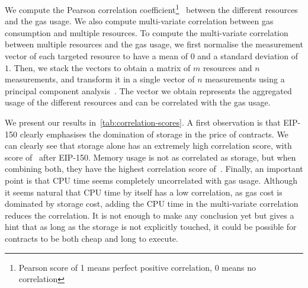 We compute the Pearson correlation coefficient\footnote{Pearson score of 1 means perfect positive correlation, 0 means no correlation}~\cite{boslaugh2012statistics} between the different resources and the gas usage. We also compute multi-variate correlation between gas consumption and multiple resources. To compute the multi-variate correlation between multiple resources and the gas usage, we first normalise the measurement vector of each targeted resource to have a mean of $0$ and a standard deviation of $1$. Then, we stack the vectors to obtain a matrix of $m$ resources and $n$ measurements, and transform it in a single vector of $n$ measurements using a principal component analysis~\cite{abdi2010principal}. The vector we obtain represents the aggregated usage of the different resources and can be correlated with the gas usage.

We present our results in~\autoref{tab:correlation-scores}. A first observation is that EIP-150 clearly emphasises the domination of storage in the price of contracts. We can clearly see that storage alone has an extremely high correlation score, with score of~ after EIP-150. Memory usage is not as correlated as storage, but when combining both, they have the highest correlation score of~. Finally, an important point is that CPU time seems completely uncorrelated with gas usage. Although it seems natural that CPU time by itself has a low correlation, as gas cost is dominated by storage cost, adding the CPU time in the multi-variate correlation reduces the correlation. It is not enough to make any conclusion yet but gives a hint that as long as the storage is not explicitly touched, it could be possible for contracts to be both cheap and long to execute.

